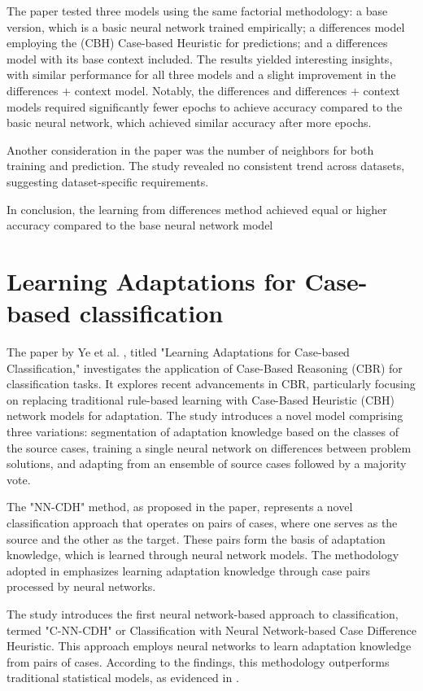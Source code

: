 \documentclass[a4paper, 12pt]{report}
\begin{document}
The paper tested three models using the same factorial methodology: a base version, which is a basic neural network trained
empirically; a differences model employing the (CBH) Case-based Heuristic for predictions; and a differences model with its base context included.
The results yielded interesting insights, with similar performance for all three models and a slight improvement in the differences $+$ context model.
Notably, the differences and differences $+$ context models required significantly fewer epochs to achieve accuracy compared to the basic neural network, which achieved similar accuracy after more epochs.

Another consideration in the paper \cite{learningFromDifferences2022} was the number of neighbors for both training and prediction.
The study revealed no consistent trend across datasets, suggesting dataset-specific requirements.

In conclusion, the learning from differences method achieved equal or higher accuracy compared to the base neural network model

\section{Learning Adaptations for Case-based classification}

The paper by Ye et al. \cite{ye2021learning}, titled "Learning Adaptations for Case-based Classification," investigates the application of Case-Based Reasoning (CBR) for classification tasks. 
It explores recent advancements in CBR, particularly focusing on replacing traditional rule-based learning with Case-Based Heuristic (CBH) network models for adaptation. 
The study introduces a novel model comprising three variations: segmentation of adaptation knowledge based on the classes of the source cases, training a single neural network on differences between problem solutions,
and adapting from an ensemble of source cases followed by a majority vote.

The "NN-CDH" method, as proposed in the paper, represents a novel classification approach that operates on pairs of cases, where one serves as the source and the other as the target. 
These pairs form the basis of adaptation knowledge, which is learned through neural network models. 
The methodology adopted in \cite{ye2021learning} emphasizes learning adaptation knowledge through case pairs processed by neural networks.

The study introduces the first neural network-based approach to classification, termed "C-NN-CDH" or Classification with Neural Network-based Case Difference Heuristic. 
This approach employs neural networks to learn adaptation knowledge from pairs of cases. According to the findings, this methodology outperforms traditional statistical models, as evidenced in \cite{jalali2017learning}.
\end{document}

